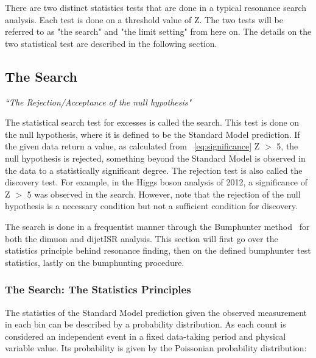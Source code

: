There are two distinct statistics tests that are done in a typical resonance search analysis. Each test is done on a threshold value of Z. The two tests will be referred to as "the search" and "the limit setting" from here on. The details on the two statistical test are described in the following section.





\subsection{The Search}
\label{sec:thesearch}

\textit{``The Rejection/Acceptance of the null hypothesis"}

The statistical search test for excesses is called the search. This test is done on the null hypothesis, where it is defined to be the Standard Model prediction. If the given data return a value, as calculated from ~\ref{eq:significance} Z $>$ 5, the null hypothesis is rejected, something beyond the Standard Model is observed in the data to a statistically significant degree. The rejection test is also called the discovery test. For example, in the Higgs boson analysis of 2012, a significance of Z
$>$ 5 was observed in the search. However, note that the rejection of the null hypothesis is a necessary condition but not a sufficient condition for discovery.

The search is done in a frequentist manner through the Bumphunter method~\cite{choudalakis2011hypothesis} for both the dimuon and dijetISR analysis. This section will first go over the statistics principle behind resonance finding, then on the defined bumphunter test statistics, lastly on the bumphunting procedure. 

\subsubsection{The Search: The Statistics Principles}
The statistics of the Standard Model prediction given the observed measurement in each bin can be described by a probability distribution. As each count is considered an independent event in a fixed data-taking period and physical variable value. Its probability is given by the Poissonian probability distribution:

